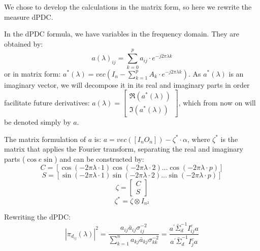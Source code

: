 \documentclass[a4paper,10pt]{article}
\begin{document}
We chose to develop the calculations in the matrix form, so here we rewrite the measure dPDC.

In the dPDC formula, we have variables in the frequency domain. They are obtained by:
\begin{equation}
a(\lambda)_{ij} = \sum_{k = 0}^{p} a_{ij} \cdot e^{-j2 \pi \lambda k}
\end{equation}
or in matrix form: $a^{\ast}(\lambda) = vec(I_{n} - \sum_{k=1}^{p} {A_{k} \cdot e^{-j2\pi\lambda k}})$. As $a^{\ast}(\lambda)$ is an imaginary vector, we will decompose it in its real and imaginary parts in order facilitate future derivatives: $a(\lambda) = \left[ \begin{array}{c} \Re(a^{\ast}(\lambda)) \\ \Im(a^{\ast}(\lambda)) \end{array} \right]$, which from now on will be denoted simply by $a$.

The matrix formulation of $a$ is:
$a = vec(\left[ I_{n} O_{n} \right]) - \zeta^{\ast} \cdot \alpha$, where $\zeta^{\ast}$ is the matrix that applies the Fourier transform, separating the real and imaginary parts ($\cos e \sin$) and can be constructed by:
\begin{equation}
C = [\cos(-2\pi\lambda \cdot 1) \cos(-2\pi\lambda \cdot 2) \dots \cos(-2\pi\lambda \cdot p)]
\end{equation}
\begin{equation}
S = \left[\sin(-2\pi\lambda \cdot 1) \sin(-2\pi\lambda \cdot 2) \dots \sin(-2\pi\lambda \cdot p)\right]
\end{equation}
\begin{equation}
\zeta = \left[\begin{array}{c} C \\ S \end{array} \right]
\end{equation}
\begin{equation}
\zeta^{\ast} = \zeta \otimes I_{n^{2}}
\end{equation}

Rewriting the dPDC:
\begin{equation} 
|\pi_{d_{ij}}(\lambda)|^{2} = \frac{a_{ij} \bar{a}_{ij} \sigma_{ij}^{-2}} {\sum_{k=1}^{n}{a_{kj} \bar{a}_{kj} \sigma_{kk}^{-2}}} = \frac{a^{'} \bar{\Sigma}_{d}^{-1} I_{ij}^{c} a}{a^{'} \bar{\Sigma}_{d}^{-1} I_{j}^{c} a}
\end{equation}
\end{document}
